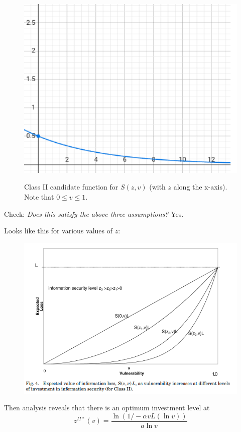 \documentclass[11pt]{article}
\begin{document}
\begin{figure}[h]
    \centering
    \includegraphics*[width=4.5in]{class2.png}
    \label{fig:class1}
    \caption{Class II candidate function for $S(z,v)$ (with $z$ along the x-axis). Note that $0 \leq v \leq 1$.}
\end{figure}
\FloatBarrier

Check: {\it Does this satisfy the above three assumptions?} Yes.

Looks like this for various values of $z$:
\begin{figure}[h]
    \centering
    \includegraphics*[width=4.5in]{fig4.png}
    \label{fig:fig4}
\end{figure}
\FloatBarrier

Then analysis reveals that there is an optimum investment level at 
$$z^{II*}(v) = \frac{\ln (1 / -\alpha v L ( \ln v))}{a \ln v}$$ 
\end{document}
